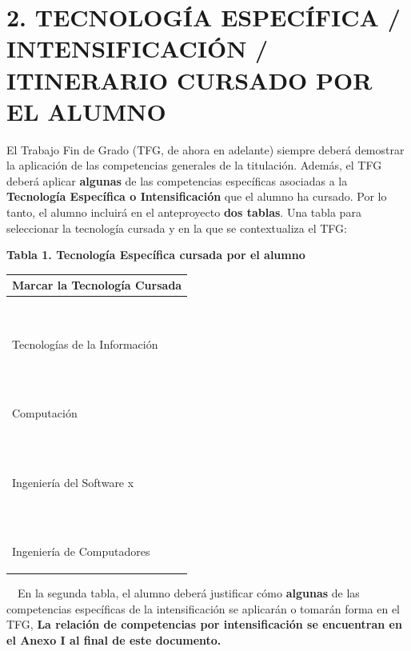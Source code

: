 \documentclass[a4paper]{article}
\begin{document}
\section{2. TECNOLOG\'IA ESPEC\'IFICA / INTENSIFICACIÓN / ITINERARIO CURSADO POR EL ALUMNO}
El Trabajo Fin de Grado (TFG, de ahora en adelante) siempre deber\'a demostrar la aplicaci\'on de las competencias
generales de la titulaci\'on. Adem\'as, el TFG deber\'a aplicar \textbf{algunas} de las competencias espec\'ificas
asociadas a la \textbf{Tecnolog\'ia Espec\'ifica o Intensificaci\'on} que el alumno ha cursado. Por lo tanto, el alumno
incluir\'a en el anteproyecto \textbf{dos tablas}. Una tabla para seleccionar la tecnolog\'ia cursada y en la que se
contextualiza el TFG:


\bigskip

{\centering\bfseries
Tabla 1. Tecnolog\'ia Espec\'ifica cursada por el alumno
\par}

\begin{center}
\tablefirsthead{}
\tablehead{}
\tabletail{}
\tablelasttail{}
\begin{supertabular}{m{6.803cm}}
{\bfseries Marcar la Tecnolog\'ia Cursada}
\\\hline
~

Tecnolog\'ias de la Informaci\'on\\
~

Computaci\'on\\
~

Ingenier\'ia del Software \hfill x\\
~

Ingenier\'ia de Computadores\\\hline
\end{supertabular}
\end{center}



\clearpage\pagestyle{plain}
\thispagestyle{FirstPage}

\ \ En la segunda tabla, el alumno deber\'a justificar c\'omo \textbf{algunas} de las competencias espec\'ificas de la
intensificaci\'on se aplicar\'an o tomar\'an forma en el TFG, \textbf{La relaci\'on de competencias por
intensificaci\'on se encuentran en el Anexo I al final de este documento. }
\end{document}
